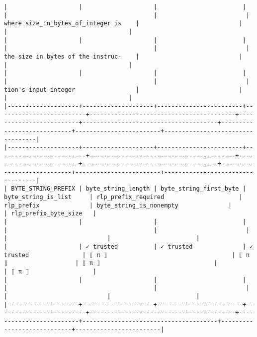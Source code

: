 \documentclass[varwidth=\maxdimen,margin=0.5cm,multi={verbatim}]{standalone}
\begin{document}
\begin{verbatim}
|                    |                    |                        |                         |                                         |                         | where size_in_bytes_of_integer is    |                            |                        |                                  |
|                    |                    |                        |                         |                                         |                         | the size in bytes of the instruc-    |                            |                        |                                  |
|                    |                    |                        |                         |                                         |                         | tion's input integer                 |                            |                        |                                  |
|--------------------+--------------------+------------------------+-------------------------+-----------------------------------------+-------------------------+--------------------------------------+----------------------------+------------------------+----------------------------------|
|--------------------+--------------------+------------------------+-------------------------+-----------------------------------------+-------------------------+--------------------------------------+----------------------------+------------------------+----------------------------------|
| BYTE_STRING_PREFIX | byte_string_length | byte_string_first_byte | byte_string_is_list     | rlp_prefix_required                     | rlp_prefix              | byte_string_is_nonempty              |                            | rlp_prefix_byte_size   |
|                    |                    |                        |                         |                                         |                         |                                      |                            |                        |
|                    | ✓ trusted          | ✓ trusted              | ✓ trusted               | ⟦ π ⟧                                   | ⟦ π ⟧                   | ⟦ π ⟧                                |                            | ⟦ π ⟧                  |
|                    |                    |                        |                         |                                         |                         |                                      |                            |                        |
|--------------------+--------------------+------------------------+-------------------------+-----------------------------------------+-------------------------+--------------------------------------+----------------------------+------------------------|

\end{verbatim}
\end{document}
